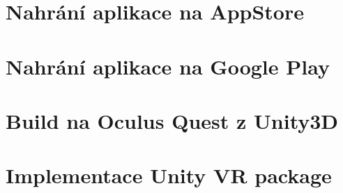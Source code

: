 \documentclass{article}
\begin{document}
\pagebreak

\section{Nahrání aplikace na AppStore}
\pagebreak

\section{Nahrání aplikace na Google Play}
\pagebreak

\section{Build na Oculus Quest z Unity3D}
\pagebreak

\section{Implementace Unity VR package}
\pagebreak
\end{document}
